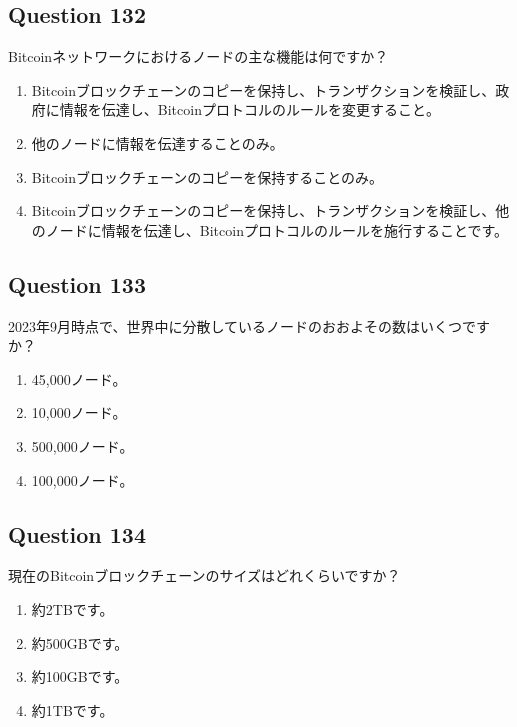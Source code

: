 \documentclass[12pt,a4paper]{article}
\begin{document}
\bigskip


\subsection*{Question 132}
Bitcoinネットワークにおけるノードの主な機能は何ですか？

\begin{enumerate}[label=\Alph*., leftmargin=*]
\item Bitcoinブロックチェーンのコピーを保持し、トランザクションを検証し、政府に情報を伝達し、Bitcoinプロトコルのルールを変更すること。
\item 他のノードに情報を伝達することのみ。
\item Bitcoinブロックチェーンのコピーを保持することのみ。
\item Bitcoinブロックチェーンのコピーを保持し、トランザクションを検証し、他のノードに情報を伝達し、Bitcoinプロトコルのルールを施行することです。
\end{enumerate}

\bigskip


\subsection*{Question 133}
2023年9月時点で、世界中に分散しているノードのおおよその数はいくつですか？

\begin{enumerate}[label=\Alph*., leftmargin=*]
\item 45,000ノード。
\item 10,000ノード。
\item 500,000ノード。
\item 100,000ノード。
\end{enumerate}

\bigskip


\subsection*{Question 134}
現在のBitcoinブロックチェーンのサイズはどれくらいですか？

\begin{enumerate}[label=\Alph*., leftmargin=*]
\item 約2TBです。
\item 約500GBです。
\item 約100GBです。
\item 約1TBです。
\end{enumerate}
\end{document}

